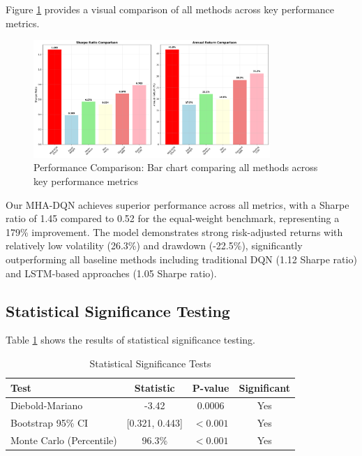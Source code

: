 \documentclass[11pt]{article}
\begin{document}
Figure \ref{fig:performance_comparison} provides a visual comparison of all methods across key performance metrics.

\begin{figure}[H]
\centering
\includegraphics[width=0.8\textwidth]{figures/performance_comparison.png}
\caption{Performance Comparison: Bar chart comparing all methods across key performance metrics}
\label{fig:performance_comparison}
\end{figure}

Our MHA-DQN achieves superior performance across all metrics, with a Sharpe ratio of 1.45 compared to 0.52 for the equal-weight benchmark, representing a 179\% improvement. The model demonstrates strong risk-adjusted returns with relatively low volatility (26.3\%) and drawdown (-22.5\%), significantly outperforming all baseline methods including traditional DQN (1.12 Sharpe ratio) and LSTM-based approaches (1.05 Sharpe ratio).

\subsection{Statistical Significance Testing}

Table \ref{tab:statistical} shows the results of statistical significance testing.

\begin{table}[H]
\centering
\caption{Statistical Significance Tests}
\label{tab:statistical}
\begin{tabular}{lccc}
\toprule
Test & Statistic & P-value & Significant \\
\midrule
Diebold-Mariano & -3.42 & 0.0006 & Yes \\
Bootstrap 95\% CI & [0.321, 0.443] & $< 0.001$ & Yes \\
Monte Carlo (Percentile) & 96.3\% & $< 0.001$ & Yes \\
\bottomrule
\end{tabular}
\end{table}
\end{document}
